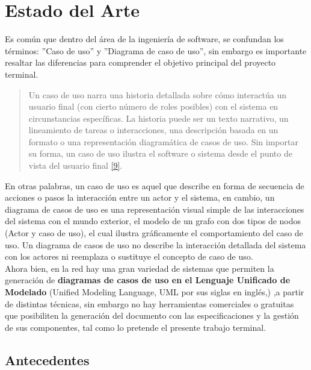 \chapter{Estado del Arte} \label{cap:dos}

	Es común que dentro del área de la ingeniería de software, se confundan los términos: ''Caso de uso'' y ''Diagrama de caso de uso'', sin embargo es importante resaltar las diferencias para comprender el objetivo principal del proyecto terminal.
	
	\begin{quote}
		\small Un caso de uso narra una historia detallada sobre cómo interactúa un usuario final (con cierto número de roles posibles) con el sistema en circunstancias específicas. La historia puede ser un texto narrativo, un lineamiento de tareas o interacciones, una descripción basada en un formato o una representación diagramática de casos de uso. Sin importar su forma, un caso de uso ilustra el software o sistema desde el punto de vista del usuario final \hyperlink{b09}{[9]}. 
	\end{quote}
	 	
	En otras palabras, un caso de uso es aquel que describe en forma de secuencia de acciones o pasos la interacción entre un actor y el sistema, en cambio, un diagrama de casos de uso es una representación visual simple de las interacciones del sistema con el mundo exterior, el modelo de un grafo con dos tipos de nodos (Actor y caso de uso), el cual ilustra gráficamente el comportamiento del caso de uso. Un diagrama de casos de uso no describe la interacción detallada del sistema con los actores ni reemplaza o sustituye el concepto de caso de uso.\\
	
	Ahora bien, en la red hay una gran variedad de sistemas que permiten la generación de \textbf {diagramas de casos de uso en el Lenguaje Unificado de Modelado} (Unified Modeling Language, UML por sus siglas en inglés,) ,a partir de distintas técnicas, sin embargo no hay herramientas comerciales o gratuitas que posibiliten la generación del documento con las especificaciones y la gestión de sus componentes, tal como lo pretende el presente trabajo terminal.
	
    \newpage
\section{Antecedentes}

